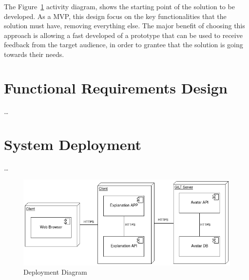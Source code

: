The Figure~\ref{fig:mvp} activity diagram, shows the starting point of the solution to be developed.
As a \gls{MVP}, this design focus on the key functionalities that the solution must have, removing everything else.
The major benefit of choosing this approach is allowing a fast developed of a prototype that can be used to receive feedback from the target audience, in order to grantee that the solution is going towards their needs.

\section{Functional Requirements Design}

\dots %

\section{System Deployment}

\dots %

\begin{figure}[H]
\centering
\includegraphics[width=\textwidth,keepaspectratio]{ch4/assets/deployment_diagram.png}
\caption[Deployment Diagram]{Deployment Diagram}
\label{fig:mvp}
\end{figure}

